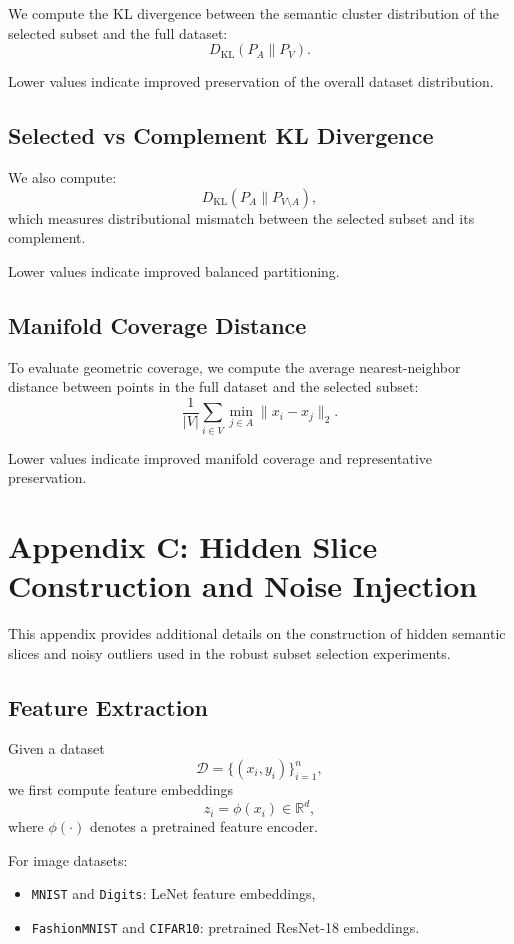 \documentclass[11pt]{article}
\begin{document}
We compute the KL divergence between the semantic cluster distribution of the selected subset and the full dataset:
\[
D_{\text{KL}}(P_A \| P_V).
\]

Lower values indicate improved preservation of the overall dataset distribution.

\subsection{Selected vs Complement KL Divergence}

We also compute:
\[
D_{\text{KL}}(P_A \| P_{V\setminus A}),
\]
which measures distributional mismatch between the selected subset and its complement.

Lower values indicate improved balanced partitioning.

\subsection{Manifold Coverage Distance}

To evaluate geometric coverage, we compute the average nearest-neighbor distance between points in the full dataset and the selected subset:
\[
\frac{1}{|V|}
\sum_{i\in V}
\min_{j\in A}
\|x_i-x_j\|_2.
\]

Lower values indicate improved manifold coverage and representative preservation.

\section{Appendix C: Hidden Slice Construction and Noise Injection}
\label{appendix:hidden_slices}

This appendix provides additional details on the construction of hidden semantic slices and noisy outliers used in the robust subset selection experiments.

\subsection{Feature Extraction}

Given a dataset
\[
\mathcal{D}=\{(x_i,y_i)\}_{i=1}^n,
\]
we first compute feature embeddings
\[
z_i=\phi(x_i)\in\mathbb{R}^d,
\]
where $\phi(\cdot)$ denotes a pretrained feature encoder.

For image datasets:
\begin{itemize}
    \item \texttt{MNIST} and \texttt{Digits}: LeNet feature embeddings,
    \item \texttt{FashionMNIST} and \texttt{CIFAR10}: pretrained ResNet-18 embeddings.
\end{itemize}
\end{document}
